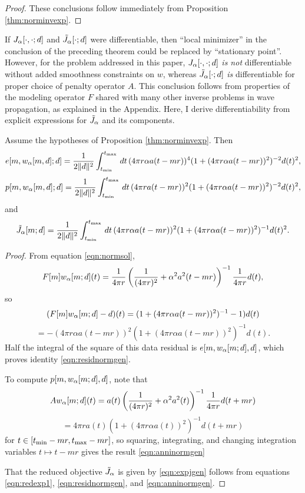 \begin{proof} These conclusions follow immediately from Proposition
  \ref{thm:norminvexp}.
\end{proof}

If $J_{\alpha}[\cdot,\cdot;d]$ and $\tilde{J}_{\alpha}[\cdot;d]$
were differentiable, then ``local minimizer'' in the conclusion of the
preceding theorem could be replaced by ``stationary point''. However,
for the problem addressed in this paper, $J_{\alpha}[\cdot,\cdot;d]$ {\em is
  not} differentiable without added smoothness constraints on $w$,
whereas $\tilde{J}_{\alpha}[\cdot;d]$ {\em is} differentiable for proper choice of
penalty operator $A$.
This conclusion follows from properties of the modeling operator $F$
shared with many other inverse problems in wave propagation, as
explained in the Appendix. Here, I derive differentiability from explicit
expressions for $\tilde{J}_{\alpha}$ and its components.

\begin{proposition}
  \label{thm:epjgen}
  Assume the hypotheses of Proposition \ref{thm:norminvexp}. Then
  \begin{equation}
  \label{eqn:residnormgen}
  e[m,w_{\alpha}[m,d];d] = \frac{1}{2\|d\|^2}\int_{t_{\rm min}}^{t_{\rm max}} \,dt\,(4\pi r \alpha a(t-mr))^4(1 +
  (4\pi r \alpha a(t-mr))^2)^{-2}d(t)^2,
\end{equation}
\begin{equation}
  \label{eqn:anninormgen}
  p[m,w_{\alpha}[m,d];d] = \frac{1}{2\|d\|^2}\int_{t_{\rm min}}^{t_{\rm max}} \,dt\,(4\pi r a(t-mr))^2(1 +
  (4\pi r \alpha a(t-mr))^2)^{-2}d(t)^2,
\end{equation}
and
\begin{equation}
  \label{eqn:expjgen}
\tilde{J}_{\alpha}[m;d] = \frac{1}{2\|d\|^2}\int_{t_{\rm min}}^{t_{\rm max}}\,dt\,(4\pi r \alpha a(t-mr))^2(1+(4\pi r \alpha 
a(t-mr))^2)^{-1}d(t)^2. 
\end{equation}
\end{proposition}

\begin{proof}
  From equation \ref{eqn:normsol},
  \[
    F[m]w_{\alpha}[m;d](t) = 
    \frac{1}{4 \pi r}\left(\frac{1}{(4\pi r)^2} + \alpha^2
      a^2(t-mr)\right)^{-1}\frac{1}{4 \pi r}d(t),
  \]
  so
  \[
    (F[m]w_{\alpha}[m;d]-d)(t) = (1 + (4 \pi r\alpha
    a(t-mr))^2)^{-1}-1)d(t)
  \]
  \[
    = -(4 \pi r\alpha a(t-mr))^2(1 + (4 \pi r\alpha
    a(t-mr))^2)^{-1}d(t).
  \]
  Half the integral of the square of this data residual is
  $e[m,w_{\alpha}[m;d],d]$, which proves identity \ref{eqn:residnormgen}.

  To compute $p[m,w_{\alpha}[m;d],d]$, note that
  \[
    Aw_{\alpha}[m;d](t)=a(t) \left(\frac{1}{(4\pi r)^2} + \alpha^2
      a^2(t)\right)^{-1}\frac{1}{4 \pi r}d(t+mr)
  \]
  \[
    = 4\pi r a(t) (1 + (4\pi r \alpha a(t))^2)^{-1}d(t+mr)
  \]
  for $ t \in [t_{\rm min}-mr, t_{\rm max}-mr]$, so squaring,
  integrating, and changing integration variables $t \mapsto t-mr$
  gives the result \ref{eqn:anninormgen}

  That the reduced objective $\tilde{J}_{\alpha}$ is given by \ref{eqn:expjgen} follows from equations \ref{eqn:redexp1}, \ref{eqn:residnormgen}, and
  \ref{eqn:anninormgen}.
\end{proof}

